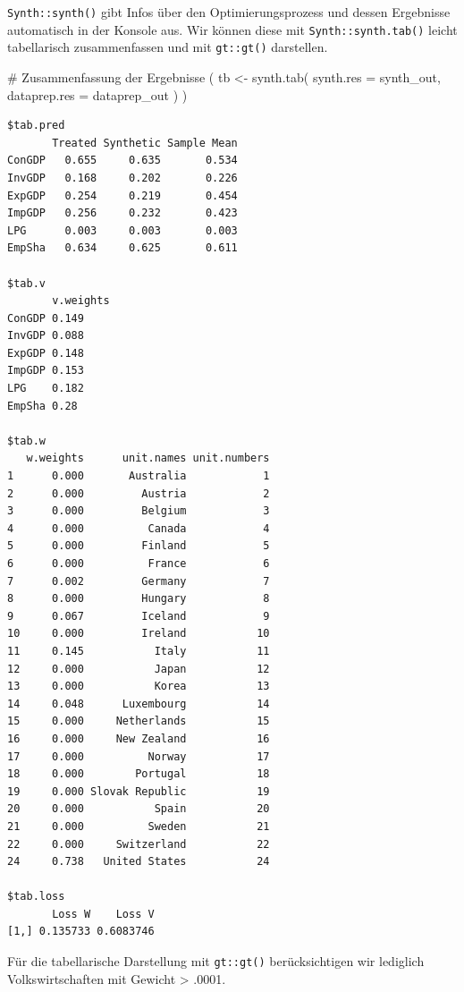 \documentclass[
  a4paper,
  DIV=11,
  oneside]{scrreprt}
\newenvironment{Shaded}{\begin{snugshade}}{\end{snugshade}}
\newcommand{\AttributeTok}[1]{\textcolor[rgb]{0.40,0.45,0.13}{#1}}
\newcommand{\CommentTok}[1]{\textcolor[rgb]{0.37,0.37,0.37}{#1}}
\newcommand{\FunctionTok}[1]{\textcolor[rgb]{0.28,0.35,0.67}{#1}}
\newcommand{\NormalTok}[1]{\textcolor[rgb]{0.00,0.23,0.31}{#1}}
\newcommand{\OtherTok}[1]{\textcolor[rgb]{0.00,0.23,0.31}{#1}}
\begin{document}
\texttt{Synth::synth()} gibt Infos über den Optimierungsprozess und
dessen Ergebnisse automatisch in der Konsole aus. Wir können diese mit
\texttt{Synth::synth.tab()} leicht tabellarisch zusammenfassen und mit
\texttt{gt::gt()} darstellen.

\begin{Shaded}
\begin{Highlighting}[]
\CommentTok{\# Zusammenfassung der Ergebnisse}
\NormalTok{(}
\NormalTok{  tb }\OtherTok{\textless{}{-}} \FunctionTok{synth.tab}\NormalTok{(}
    \AttributeTok{synth.res =}\NormalTok{ synth\_out, }
    \AttributeTok{dataprep.res =}\NormalTok{ dataprep\_out}
\NormalTok{  )  }
\NormalTok{)}
\end{Highlighting}
\end{Shaded}

\begin{verbatim}
$tab.pred
       Treated Synthetic Sample Mean
ConGDP   0.655     0.635       0.534
InvGDP   0.168     0.202       0.226
ExpGDP   0.254     0.219       0.454
ImpGDP   0.256     0.232       0.423
LPG      0.003     0.003       0.003
EmpSha   0.634     0.625       0.611

$tab.v
       v.weights
ConGDP 0.149    
InvGDP 0.088    
ExpGDP 0.148    
ImpGDP 0.153    
LPG    0.182    
EmpSha 0.28     

$tab.w
   w.weights      unit.names unit.numbers
1      0.000       Australia            1
2      0.000         Austria            2
3      0.000         Belgium            3
4      0.000          Canada            4
5      0.000         Finland            5
6      0.000          France            6
7      0.002         Germany            7
8      0.000         Hungary            8
9      0.067         Iceland            9
10     0.000         Ireland           10
11     0.145           Italy           11
12     0.000           Japan           12
13     0.000           Korea           13
14     0.048      Luxembourg           14
15     0.000     Netherlands           15
16     0.000     New Zealand           16
17     0.000          Norway           17
18     0.000        Portugal           18
19     0.000 Slovak Republic           19
20     0.000           Spain           20
21     0.000          Sweden           21
22     0.000     Switzerland           22
24     0.738   United States           24

$tab.loss
       Loss W    Loss V
[1,] 0.135733 0.6083746
\end{verbatim}

Für die tabellarische Darstellung mit \texttt{gt::gt()} berücksichtigen
wir lediglich Volkswirtschaften mit Gewicht \textgreater{} .0001.
\end{document}
